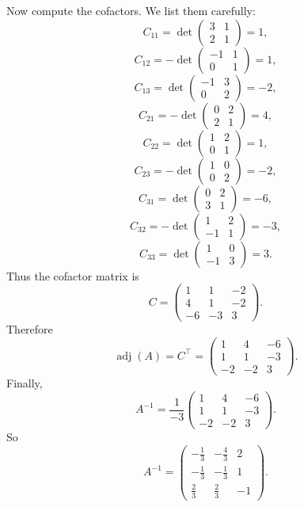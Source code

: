 Now compute the cofactors. We list them carefully:
\[
C_{11}=\det\begin{pmatrix}3&1\\2&1\end{pmatrix}=1,
\]
\[
C_{12}=-\det\begin{pmatrix}-1&1\\0&1\end{pmatrix}=1,
\]
\[
C_{13}=\det\begin{pmatrix}-1&3\\0&2\end{pmatrix}=-2,
\]
\[
C_{21}=-\det\begin{pmatrix}0&2\\2&1\end{pmatrix}=4,
\]
\[
C_{22}=\det\begin{pmatrix}1&2\\0&1\end{pmatrix}=1,
\]
\[
C_{23}=-\det\begin{pmatrix}1&0\\0&2\end{pmatrix}=-2,
\]
\[
C_{31}=\det\begin{pmatrix}0&2\\3&1\end{pmatrix}=-6,
\]
\[
C_{32}=-\det\begin{pmatrix}1&2\\-1&1\end{pmatrix}=-3,
\]
\[
C_{33}=\det\begin{pmatrix}1&0\\-1&3\end{pmatrix}=3.
\]
Thus the cofactor matrix is
\[
C=\begin{pmatrix}
1&1&-2\\
4&1&-2\\
-6&-3&3
\end{pmatrix}.
\]
Therefore
\[
\operatorname{adj}(A)=C^{\top}
=\begin{pmatrix}
1&4&-6\\
1&1&-3\\
-2&-2&3
\end{pmatrix}.
\]
Finally,
\[
A^{-1}=\frac{1}{-3}\begin{pmatrix}
1&4&-6\\
1&1&-3\\
-2&-2&3
\end{pmatrix}.
\]
So
\[
A^{-1}=\begin{pmatrix}
-\frac13&-\frac43&2\\
-\frac13&-\frac13&1\\
\frac23&\frac23&-1
\end{pmatrix}.
\]

